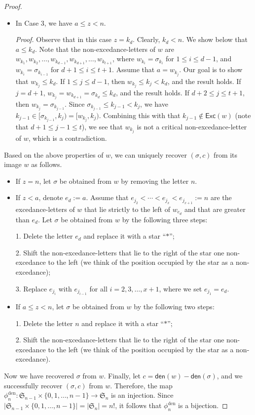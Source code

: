 \documentclass[10pt,a4paper]{amsart}
\begin{document}
\begin{proof}
\begin{itemize}
	
\item[$\bullet$] In Case 3, we have $a\leq z<n$.

\emph{Proof.} Observe that in this case $z=k_{d}$.  
Clearly, $k_{d}<n$.
We show below that $a\leq k_{d}$.
Note that the non-excedance-letters of $w$ are
$w_{k_{1}},w_{k_{2}},\ldots,w_{k_{d-1}},w_{k_{d+1}},\ldots,w_{k_{t+1}}$,
where $w_{k_{i}}=\sigma_{k_{i}}$ for $1\leq i\leq d-1$, and $w_{k_{i}}=\sigma_{k_{i-1}}$ for $d+1\leq i\leq t+1$.
Assume that $a=w_{k_{j}}$. 
Our goal is to show that $w_{k_{j}}\leq k_{d}$.
If $1\leq j\leq d-1$, then
$w_{k_{j}}\leq k_{j}<k_{d}$, and the result holds.
If $j=d+1$, $w_{k_{j}}=w_{k_{d+1}}=\sigma_{k_{d}}\leq k_{d}$, 
and the result holds.
If $d+2\leq j\leq t+1$, then $w_{k_{j}}=\sigma_{k_{j-1}}$.
Since $\sigma_{k_{j-1}}\leq k_{j-1}< k_{j}$,
we have $k_{j-1}\in[\sigma_{k_{j-1}},k_{j})=[w_{k_{j}},k_{j})$.
Combining this with that $k_{j-1}\notin\textsf{Exc}(w)$ (note that $d+1\leq j-1\leq t$),
we see that $w_{k_{j}}$ is not a critical non-excedance-letter of $w$,
which is a contradiction.
\end{itemize}
Based on the above properties of $w$, 
we can uniquely recover $(\sigma,c)$ from its image $w$ as follows.
\begin{itemize}
\item[$\bullet$] If $z=n$,
let $\sigma$ be obtained from $w$ by removing the letter $n$.

\item[$\bullet$] If $z<a$,  denote $e_{d}:=a$.
Assume that $e_{j_{2}}<\cdots<e_{j_{x}}<e_{j_{x+1}}:=n$ are the excedance-letters of $w$ that lie strictly to the left of $w_{e_{d}}$ and that are greater than $e_{d}$.
Let $\sigma$ be obtained from $w$ by the following three steps:

1. Delete the letter $e_{d}$ and replace it with a star ``$\ast$'';

2. Shift the non-excedance-letters that lie to the right of the star one non-excedance to the left (we think of the position occupied by the star as a non-excedance);

3. Replace $e_{j_{i}}$ with $e_{j_{i-1}}$ for all $i=2,3,\ldots,x+1$, 
where we set $e_{j_{1}}=e_{d}$.

\item[$\bullet$] If $a\leq z<n$,
let $\sigma$ be obtained from $w$ by the following two steps:

1. Delete the letter $n$ and replace it with a star ``$\ast$'';

2. Shift the non-excedance-letters that lie to the right of the star one non-excedance to the left (we think of the position occupied by the star as a non-excedance).
\end{itemize}
Now we have recovered $\sigma$ from $w$.
Finally, let $c=\textsf{den}(w)-\textsf{den}(\sigma)$,
and we successfully recover $(\sigma,c)$ from $w$.
Therefore, the map $\phi_{n}^{\text{den}}: \mathfrak{S}_{n-1}\times\{0,1,\ldots,n-1\}\rightarrow\mathfrak{S}_{n}
$ is an injection.
Since $|\mathfrak{S}_{n-1}\times\{0,1,\ldots,n-1\}|=|\mathfrak{S}_{n}|=n!$,
it follows that $\phi_{n}^{\text{den}}$ is a bijection.
\end{proof}
\end{document}
